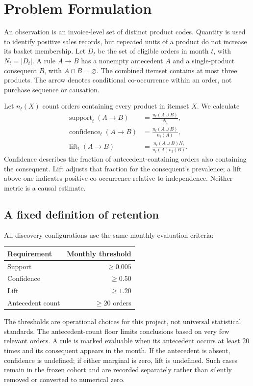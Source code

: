 \section{Problem Formulation}
An observation is an invoice-level set of distinct product codes. Quantity is used to identify positive sales records, but repeated units of a product do not increase its basket membership. Let $D_t$ be the set of eligible orders in month $t$, with $N_t=|D_t|$. A rule $A\rightarrow B$ has a nonempty antecedent $A$ and a single-product consequent $B$, with $A\cap B=\varnothing$. The combined itemset contains at most three products. The arrow denotes conditional co-occurrence within an order, not purchase sequence or causation.

Let $n_t(X)$ count orders containing every product in itemset $X$. We calculate
\begin{align}
\operatorname{support}_t(A\rightarrow B) &= \frac{n_t(A\cup B)}{N_t},\\
\operatorname{confidence}_t(A\rightarrow B) &= \frac{n_t(A\cup B)}{n_t(A)},\\
\operatorname{lift}_t(A\rightarrow B) &= \frac{n_t(A\cup B)N_t}{n_t(A)n_t(B)}.
\end{align}
Confidence describes the fraction of antecedent-containing orders also containing the consequent. Lift adjusts that fraction for the consequent's prevalence; a lift above one indicates positive co-occurrence relative to independence. Neither metric is a causal estimate.

\subsection{A fixed definition of retention}
All discovery configurations use the same monthly evaluation criteria:
\begin{center}
\begin{tabular}{lr}
\toprule
Requirement & Monthly threshold\\
\midrule
Support & $\geq 0.005$\\
Confidence & $\geq 0.50$\\
Lift & $\geq 1.20$\\
Antecedent count & $\geq 20$ orders\\
\bottomrule
\end{tabular}
\end{center}
The thresholds are operational choices for this project, not universal statistical standards. The antecedent-count floor limits conclusions based on very few relevant orders. A rule is marked evaluable when its antecedent occurs at least 20 times and its consequent appears in the month. If the antecedent is absent, confidence is undefined; if either marginal is zero, lift is undefined. Such cases remain in the frozen cohort and are recorded separately rather than silently removed or converted to numerical zero.

